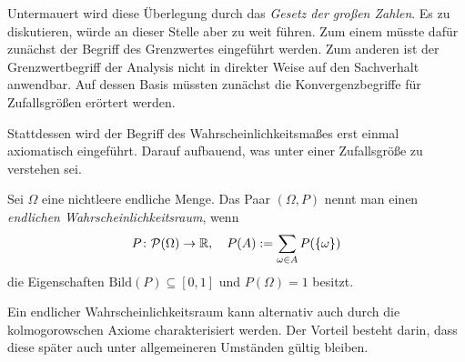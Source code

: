 Untermauert wird diese Überlegung durch das \emph{Gesetz der großen
Zahlen}. Es zu diskutieren, würde an dieser Stelle aber zu weit führen.
Zum einem müsste dafür zunächst der Begriff des Grenzwertes eingeführt
werden. Zum anderen ist der Grenzwertbegriff der Analysis nicht in direkter
Weise auf den Sachverhalt anwendbar. Auf dessen Basis müssten zunächst
die Konvergenzbegriffe für Zufallsgrößen erörtert werden.

Stattdessen wird der Begriff des Wahrscheinlichkeitsmaßes erst einmal
axiomatisch eingeführt. Darauf aufbauend, was unter einer Zufallsgröße
zu verstehen sei.

\begin{Definition}\newlinefirst
Sei $\Omega$ eine nichtleere endliche Menge. Das Paar $(\Omega,P)$ nennt
man einen \emph{endlichen Wahrscheinlichkeitsraum}, wenn
\[P\colon\mathcal P(\Omega)\to\mathbb R,\quad P(A) := \sum_{\omega\in A}P(\{\omega\})\]
die Eigenschaften $\mathrm{Bild}(P)\subseteq [0,1]$ und $P(\Omega)=1$ besitzt.
\end{Definition}

\noindent
Ein endlicher Wahrscheinlichkeitsraum kann alternativ auch durch die
kolmogorowschen Axiome charakterisiert werden. Der Vorteil besteht darin,
dass diese später auch unter allgemeineren Umständen gültig bleiben.

